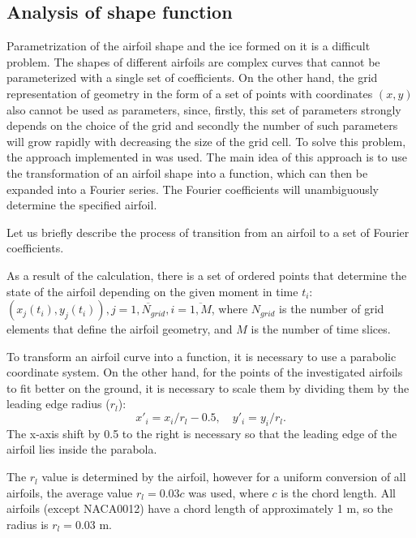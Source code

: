 \documentclass[aerospace,article,submit,moreauthors,pdftex]{Definitions/mdpi}
\begin{document}
\subsection{Analysis of shape function \label{sec:Fourier}}

Parametrization of the airfoil shape and the ice formed on it is a difficult problem. The shapes of different airfoils are complex curves that cannot be parameterized with a single set of coefficients. On the other hand, the grid representation of geometry in the form of a set of points with coordinates $(x, y)$ also cannot be used as parameters, since, firstly, this set of parameters strongly depends on the choice of the grid and secondly the number of such parameters will grow rapidly with decreasing the size of the grid cell. To solve this problem, the approach implemented in \cite{OgretimHuebschShinn2006} was used. The main idea of this approach is to use the transformation of an airfoil shape into a function, which can then be expanded into a Fourier series. The Fourier coefficients will unambiguously determine the specified airfoil.

Let us briefly describe the process of transition from an airfoil to a set of Fourier coefficients.

As a result of the calculation, there is a set of ordered points that determine the state of the airfoil depending on the given moment in time $ t_i $: $(x_j (t_i), y_j (t_i)), j = \overline{1, N_{grid}}, i = \overline{1, M} $, where $ N_{grid} $ is the number of grid elements that define the airfoil geometry, and $ M $ is the number of time slices.

To transform an airfoil curve into a function, it is necessary to use a parabolic coordinate system. On the other hand, for the points of the investigated airfoils to fit better on the ground, it is necessary to scale them by dividing them by the leading edge radius ($ r_l $):
\begin{equation}
    \label{eq:xy_scale}
    x'_i = x_i/r_l - 0.5, \quad y'_i = y_i/r_l.
\end{equation}
The x-axis shift by 0.5 to the right is necessary so that the leading edge of the airfoil lies inside the parabola.

The $ r_l $ value is determined by the airfoil, however for a uniform conversion of all airfoils, the average value $ r_l = 0.03 c $ was used, where $ c $ is the chord length. All airfoils (except NACA0012) have a chord length of approximately 1 m, so the radius is $ r_l = 0.03 $ m. 
\end{document}
